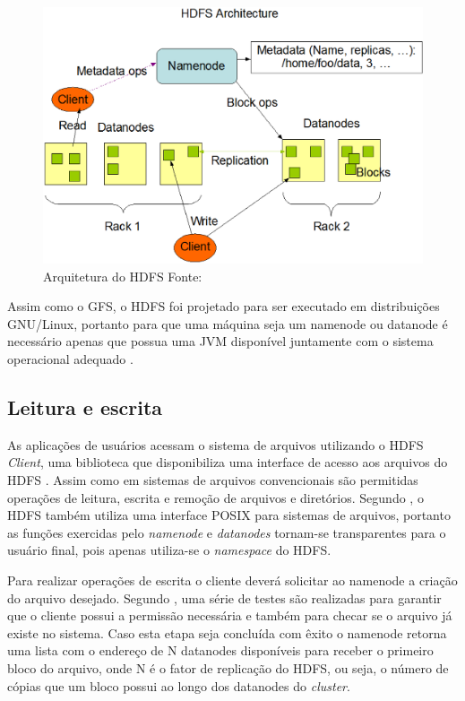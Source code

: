 \begin{figure}[ht!]
	\centering
	\includegraphics[keepaspectratio=true,scale=0.5]
	  {figuras/hdfs-arquitetura.eps}
	\caption[Arquitetura do HDFS]{Arquitetura do HDFS
	\protect\linebreak Fonte: \cite{hadoopSiteHDFS}}
	\label{fig-hdfs-arquitetura}
\end{figure}
\FloatBarrier

Assim como o GFS, o HDFS foi projetado para ser executado em distribuições GNU/Linux,  portanto para que uma máquina seja um namenode ou datanode é necessário apenas que possua uma JVM disponível juntamente com o sistema operacional adequado \cite{hadoopSiteHDFS}.

\subsection{Leitura e escrita}

As aplicações de usuários acessam o sistema de arquivos utilizando o HDFS \textit{Client}, uma biblioteca que disponibiliza uma interface de acesso aos arquivos do HDFS \cite{shvachko2010}. Assim como em sistemas de arquivos convencionais são permitidas operações de leitura, escrita e remoção de arquivos e diretórios. Segundo , o HDFS também utiliza uma interface POSIX para sistemas de arquivos, portanto as funções exercidas pelo \textit{namenode} e \textit{datanodes} tornam-se transparentes para o usuário final, pois apenas utiliza-se o \textit{namespace} do HDFS.

Para realizar operações de escrita o cliente deverá solicitar ao namenode a criação do arquivo desejado. Segundo , uma série de testes são realizadas para garantir que o cliente possui a permissão necessária e também para checar se o arquivo já existe no sistema. Caso esta etapa seja concluída com êxito o namenode retorna uma lista com o endereço de N datanodes disponíveis para receber o primeiro bloco do arquivo, onde N é o fator de replicação do HDFS, ou seja, o número de cópias que um bloco possui ao longo dos datanodes do \textit{cluster}.

